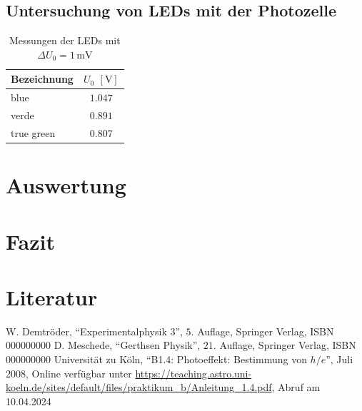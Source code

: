 \documentclass[12pt,a4paper]{scrartcl}
\numberwithin{equation}{section} %
\begin{document}
\subsection{Untersuchung von LEDs mit der Photozelle}
\begin{table}[h!]
	\centering
	\begin{tabular}{l|c}
		Bezeichnung & $U_0$ $[\mathrm{V}]$ \\
		\hline
		blue & $1.047$ \\
		verde & $0.891$ \\
		true green & $0.807$ \\
	\end{tabular}
	\caption{Messungen der LEDs mit $\Delta U_0=1\mathrm{\,mV}$}
	\label{tab:LEDs}
\end{table}


\clearpage
\hypertarget{auswertung}{%
\section{Auswertung}\label{auswertung}}

\clearpage
\hypertarget{fazit}{%
\section{Fazit}\label{fazit}}

\clearpage
\hypertarget{literatur}{%
\section{Literatur}\label{literatur}}
\renewcommand{\section}[2]{}

\begin{thebibliography}{99}
	W. Demtröder, ``Experimentalphysik 3'', $5.$ Auflage, Springer Verlag,
	ISBN 000000000
	D. Meschede, ``Gerthsen Physik'', $21.$ Auflage, Springer Verlag,
	ISBN 000000000
		Universität zu Köln, ``B1.4: Photoeffekt: Bestimmung von $h/e$'', Juli 2008,
		Online verfügbar unter \url{https://teaching.astro.uni-koeln.de/sites/default/files/praktikum_b/Anleitung_1.4.pdf},
		Abruf am 10.04.2024
\end{thebibliography}
\end{document}
